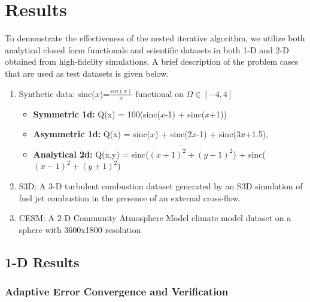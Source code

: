 
\section{Results}
\label{sec:results}

To demonstrate the effectiveness of the nested iterative algorithm, we utilize both analytical closed form functionals and scientific datasets in both 1-D and 2-D obtained from high-fidelity simulations. A brief description of the problem cases that are used as test datasets is given below.

\begin{enumerate}
	\item Synthetic data: sinc($x$)=$\frac{sin(x)}{x}$ functional on $\Omega \in [-4, 4]$
	\begin{itemize}
		\item \textbf{Symmetric 1d:} Q(x) = 100(sinc($x$-1) + sinc($x$+1))
		\item \textbf{Asymmetric 1d:} Q(x) = sinc($x$) + sinc(2$x$-1) + sinc(3$x$+1.5), 
		\item \textbf{Analytical 2d:} Q(x,y) = sinc($(x+1)^2+(y-1)^2$) + sinc($(x-1)^2+(y+1)^2$)
	\end{itemize}
	\item S3D: A 3-D turbulent combustion dataset generated by an S3D simulation \cite{chen-s3d-2009} of fuel jet combustion in the presence of an external cross-flow. 
	\item CESM: A 2-D Community Atmosphere Model climate model dataset on a sphere with 3600x1800 resolution
\end{enumerate}


\subsection{1-D Results}\label{AA}


\subsubsection{Adaptive Error Convergence and Verification}

